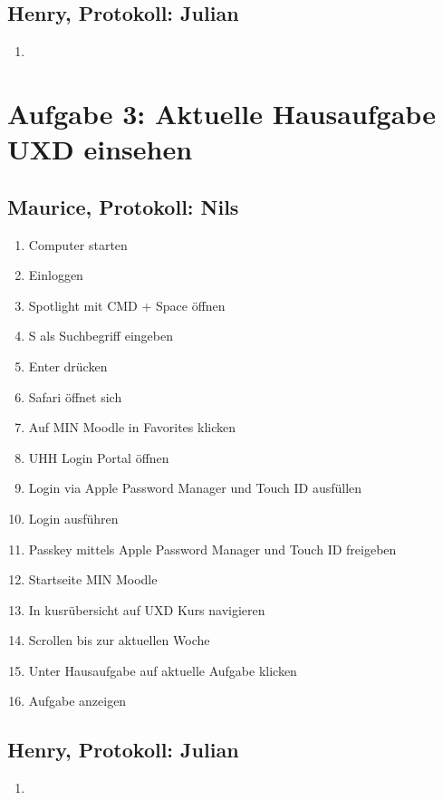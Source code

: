 \documentclass[a4paper,10pt]{article}
\begin{document}
    \subsection{Henry, Protokoll: Julian}
    \begin{enumerate}
        \item
    \end{enumerate}

    \section{Aufgabe 3: Aktuelle Hausaufgabe UXD einsehen}
    \subsection{Maurice, Protokoll: Nils}
    \begin{enumerate}
        \item Computer starten
        \item Einloggen
        \item Spotlight mit CMD + Space öffnen
        \item \glqq S\grqq{} als Suchbegriff eingeben
        \item Enter drücken
        \item Safari öffnet sich
        \item Auf MIN Moodle in Favorites klicken
        \item UHH Login Portal öffnen
        \item Login via Apple Password Manager und Touch ID ausfüllen
        \item Login ausführen
        \item Passkey mittels Apple Password Manager und Touch ID freigeben
        \item Startseite MIN Moodle
        \item In kusrübersicht auf UXD Kurs navigieren
        \item Scrollen bis zur aktuellen Woche
        \item Unter \glqq Hausaufgabe\grqq{} auf aktuelle Aufgabe klicken
        \item Aufgabe anzeigen
    \end{enumerate}

    \subsection{Henry, Protokoll: Julian}
    \begin{enumerate}
        \item
    \end{enumerate}
\end{document}
